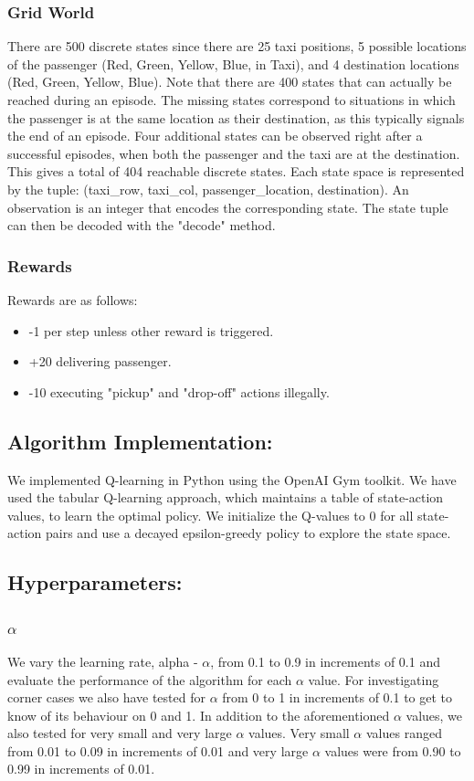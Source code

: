 \documentclass[conference]{IEEEtran}
\begin{document}
\subsubsection{Grid World}
There are 500 discrete states since there are 25 taxi positions, 5 possible locations of the passenger (Red, Green, Yellow, Blue, in Taxi), and 4 destination locations (Red, Green, Yellow, Blue). Note that there are 400 states that can actually be reached during an episode. The missing states correspond to situations in which the passenger is at the same location as their destination, as this typically signals the end of an episode. Four additional states can be observed right after a successful episodes, when both the passenger and the taxi are at the destination. This gives a total of 404 reachable discrete states. Each state space is represented by the tuple: (taxi\_row, taxi\_col, passenger\_location, destination). An observation is an integer that encodes the corresponding state. The state tuple can then be decoded with the "decode" method.
\newline
\subsubsection{Rewards}
Rewards are as follows:
\begin{itemize}
    \item -1 per step unless other reward is triggered.
    \item +20 delivering passenger.
    \item -10  executing "pickup" and "drop-off" actions illegally.
    \newline
\end{itemize}

\subsection{Algorithm Implementation:}
We implemented Q-learning in Python using the OpenAI Gym toolkit. We have used the tabular Q-learning approach, which maintains a table of state-action values, to learn the optimal policy. We initialize the Q-values to 0 for all state-action pairs and use a decayed epsilon-greedy policy to explore the state space. 

\subsection{Hyperparameters:}
\subsubsection{$\alpha$}
We vary the learning rate, alpha - $\alpha$, from 0.1 to 0.9 in increments of 0.1 and evaluate the performance of the algorithm for each $\alpha$ value. For investigating corner cases we also have tested for $\alpha$ from 0 to 1 in increments of 0.1 to get to know of its behaviour on 0 and 1. In addition to the aforementioned $\alpha$ values, we also tested for very small and very large $\alpha$ values. Very small $\alpha$ values ranged from 0.01 to 0.09 in increments of 0.01 and very large $\alpha$ values were from 0.90 to 0.99 in increments of 0.01. 
\newline
\end{document}
